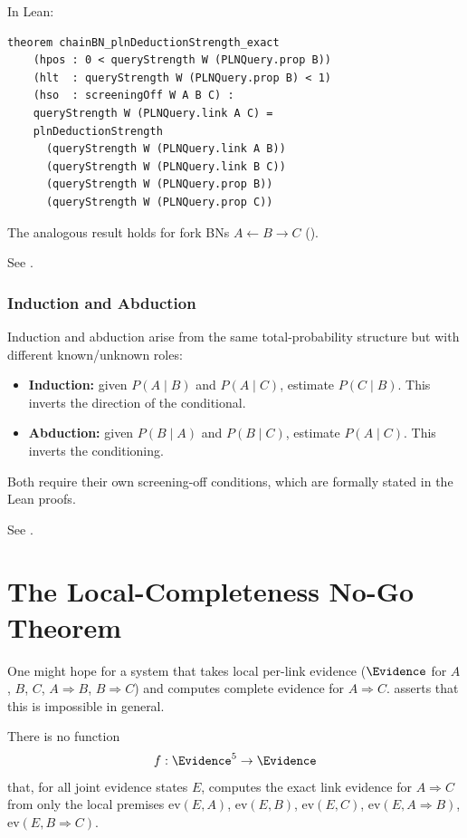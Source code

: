 \documentclass[11pt,openany]{report}
\begin{document}
In Lean:
\begin{lstlisting}
theorem chainBN_plnDeductionStrength_exact
    (hpos : 0 < queryStrength W (PLNQuery.prop B))
    (hlt  : queryStrength W (PLNQuery.prop B) < 1)
    (hso  : screeningOff W A B C) :
    queryStrength W (PLNQuery.link A C) =
    plnDeductionStrength
      (queryStrength W (PLNQuery.link A B))
      (queryStrength W (PLNQuery.link B C))
      (queryStrength W (PLNQuery.prop B))
      (queryStrength W (PLNQuery.prop C))
\end{lstlisting}

The analogous result holds for fork BNs $A \leftarrow B \to C$
().

See .

\subsection{Induction and Abduction}

Induction and abduction arise from the same total-probability structure
but with different known/unknown roles:

\begin{itemize}
\item \textbf{Induction:} given $P(A \mid B)$ and $P(A \mid C)$,
  estimate $P(C \mid B)$.  This inverts the direction of the conditional.
\item \textbf{Abduction:} given $P(B \mid A)$ and $P(B \mid C)$,
  estimate $P(A \mid C)$.  This inverts the conditioning.
\end{itemize}

Both require their own screening-off conditions, which are
formally stated in the Lean proofs.

See .


\chapter{The Local-Completeness No-Go Theorem}
\label{ch:no-go}

One might hope for a system that takes local per-link evidence
($\Evidence$ for $A$, $B$, $C$, $A \Rightarrow B$, $B \Rightarrow C$)
and computes complete evidence for $A \Rightarrow C$.  \xiPLN{} asserts
that this is impossible in general.

\begin{theorem}
\label{thm:no-go}
There is no function
\[
  f : \Evidence^5 \to \Evidence
\]
that, for all joint evidence states $E$, computes the exact link evidence
for $A \Rightarrow C$ from only the local premises
$\mathrm{ev}(E, A)$, $\mathrm{ev}(E, B)$, $\mathrm{ev}(E, C)$,
$\mathrm{ev}(E, A \Rightarrow B)$, $\mathrm{ev}(E, B \Rightarrow C)$.
\end{theorem}
\end{document}
